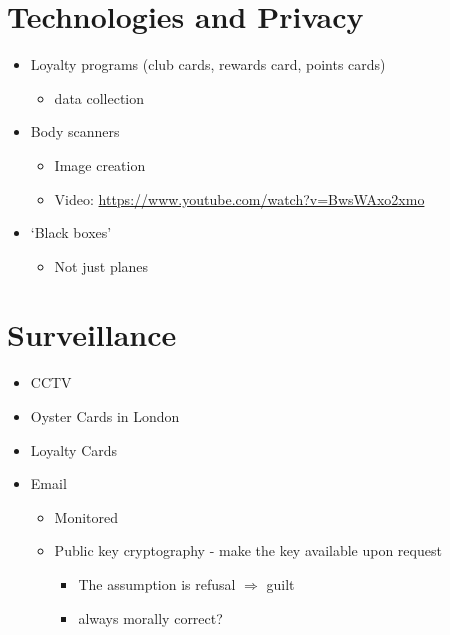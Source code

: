 \documentclass{article}
\begin{document}
\section{Technologies and Privacy}
\begin{itemize}
\item Loyalty programs (club cards, rewards card, points cards)
\begin{itemize}
\item data collection
\end{itemize}
\item Body scanners
\begin{itemize}
\item Image creation
\item Video: \url{https://www.youtube.com/watch?v=BwsWAxo2xmo}
\end{itemize}
\item `Black boxes'
\begin{itemize}
\item Not just planes
\end{itemize}
\end{itemize}



\section{Surveillance}
\begin{itemize}
\item CCTV
\item Oyster Cards in London
\item Loyalty Cards
\item Email
\begin{itemize}
\item Monitored  
\item Public key cryptography - make the key available upon request
\begin{itemize}
\item The assumption is refusal $\Rightarrow$ guilt
\item always morally correct?
\end{itemize}
\end{itemize}
\end{itemize}
\end{document}
